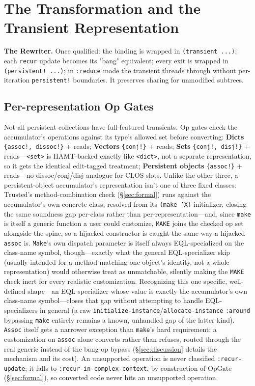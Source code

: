 \documentclass[sigplan,review,anonymous]{acmart}
\begin{document}
\section{The Transformation and the Transient Representation}
\label{sec:transformation}

\textbf{The Rewriter.} Once qualified: the binding is wrapped in \texttt{(transient ...)}; each \texttt{recur} update becomes its "bang" equivalent; every exit is wrapped in \texttt{(persistent! ...)}; in \texttt{:reduce} mode the transient threads through without per-iteration \texttt{persistent!} boundaries. It preserves sharing for unmodified subtrees.

\subsection{Per-representation Op Gates}
\label{sec:opgates}
Not all persistent collections have full-featured transients. Op gates check the accumulator's operations against its type's allowed set before converting: \textbf{Dicts} \texttt{\{assoc!, dissoc!\}} + reads; \textbf{Vectors} \texttt{\{conj!\}} + reads; \textbf{Sets} \texttt{\{conj!, disj!\}} + reads---\texttt{<set>} is HAMT-backed exactly like \texttt{<dict>}, not a separate representation, so it gets the identical edit-tagged treatment; \textbf{Persistent objects} \texttt{\{assoc!\}} + reads---no dissoc/conj/disj analogue for CLOS slots. Unlike the other three, a persistent-object accumulator's representation isn't one of three fixed classes: $\mathrm{Trusted}$'s method-combination check (§\ref{sec:formal}) runs against the accumulator's own concrete class, resolved from its \texttt{(make 'X)} initializer, closing the same soundness gap per-class rather than per-representation---and, since \texttt{make} is itself a generic function a user could customize, \texttt{MAKE} joins the checked op set alongside the spine, so a hijacked constructor is caught the same way a hijacked \texttt{assoc} is. \texttt{Make}'s own dispatch parameter is itself always EQL-specialized on the class-name symbol, though---exactly what the general EQL-specializer skip (usually intended for a method matching one object's identity, not a whole representation) would otherwise treat as unmatchable, silently making the \texttt{MAKE} check inert for every realistic customization. Recognizing this one specific, well-defined shape---an EQL-specializer whose value is exactly the accumulator's own class-name symbol---closes that gap without attempting to handle EQL-specializers in general (a raw \texttt{initialize-instance}/\texttt{allocate-instance} \texttt{:around} bypassing \texttt{make} entirely remains a known, unhandled gap of the latter kind). \texttt{Assoc} itself gets a narrower exception than \texttt{make}'s hard requirement: a customization on \texttt{assoc} alone converts rather than refuses, routed through the real generic instead of the bang-op bypass (§\ref{sec:discussion} details the mechanism and its cost). An unsupported operation is never classified \texttt{:recur-update}; it falls to \texttt{:recur-in-complex-context}, by construction of $\mathrm{OpGate}$ (§\ref{sec:formal}), so converted code never hits an unsupported operation.
\end{document}
